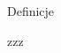 \documentclass{beamer}
\begin{document}
\section{}
\begin{frame}
    Definicje

    \begin{defins}
        \item zzz
    \end{defins}

\end{frame}
\end{document}
